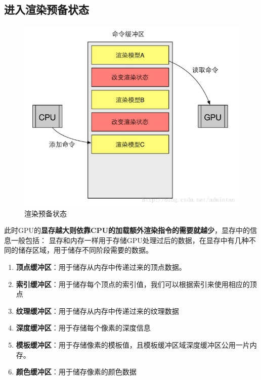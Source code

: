 \documentclass[UTF8,a4paper,12pt]{ctexbook}
\begin{document}
		\subsection{进入渲染预备状态}
			\begin{figure}[H]
				\centering
				\includegraphics[scale=0.7]{PreShader}
				\caption{渲染预备状态}
			\end{figure}
			
			此时GPU的\textbf{显存越大则依靠CPU的加载额外渲染指令的需要就越少}，显存中的信息一般包括： 
			显存和内存一样用于存储GPU处理过后的数据，在显存中有几种不同的储存区域，用于储存不同阶段需要的数据。 
			\begin{enumerate}
				\item \textbf{顶点缓冲区}：用于储存从内存中传递过来的顶点数据。
				\item \textbf{索引缓冲区}：用于储存每个顶点的索引值，我们可以根据索引来使用相应的顶点 
				\item \textbf{纹理缓冲区}：用于储存从内存中传递过来的纹理数据 
				\item \textbf{深度缓冲区}：用于存储每个像素的深度信息
				\item \textbf{模板缓冲区}：用于存储像素的模板值，且模板缓冲区域深度缓冲区公用一片内存。
				\item \textbf{颜色缓冲区}：用于储存像素的颜色数据
			\end{enumerate}	
			
\end{document}
